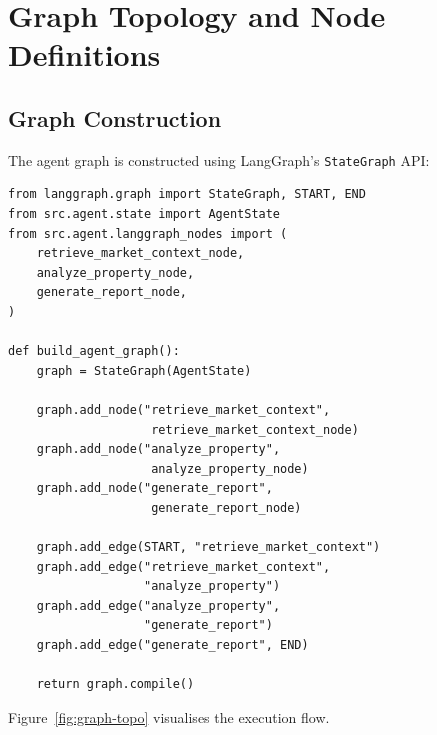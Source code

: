 \documentclass[11pt,a4paper]{article}
\begin{document}
\section{Graph Topology and Node Definitions}

\subsection{Graph Construction}

The agent graph is constructed using LangGraph's \texttt{StateGraph} API:

\begin{lstlisting}[caption={Graph definition (\texttt{src/agent/graph.py}).}]
from langgraph.graph import StateGraph, START, END
from src.agent.state import AgentState
from src.agent.langgraph_nodes import (
    retrieve_market_context_node,
    analyze_property_node,
    generate_report_node,
)

def build_agent_graph():
    graph = StateGraph(AgentState)

    graph.add_node("retrieve_market_context",
                    retrieve_market_context_node)
    graph.add_node("analyze_property",
                    analyze_property_node)
    graph.add_node("generate_report",
                    generate_report_node)

    graph.add_edge(START, "retrieve_market_context")
    graph.add_edge("retrieve_market_context",
                   "analyze_property")
    graph.add_edge("analyze_property",
                   "generate_report")
    graph.add_edge("generate_report", END)

    return graph.compile()
\end{lstlisting}

Figure~\ref{fig:graph-topo} visualises the execution flow.
\end{document}
